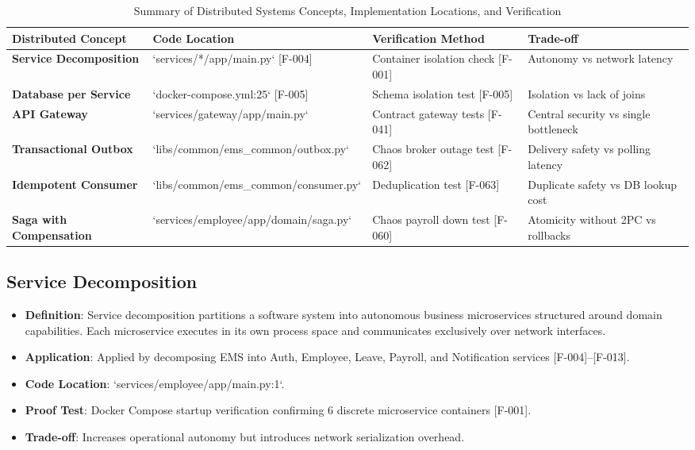 \documentclass[11pt,a4paper]{article}
\begin{document}
\begin{table}[htbp]
\caption{Summary of Distributed Systems Concepts, Implementation Locations, and Verification}
\centering
\begin{tabularx}{\linewidth}{l X X X}
\toprule
\textbf{Distributed Concept} & \textbf{Code Location} & \textbf{Verification Method} & \textbf{Trade-off} \\
\midrule
\textbf{Service Decomposition} & `services/*/app/main.py` [F-004] & Container isolation check [F-001] & Autonomy vs network latency \\
\textbf{Database per Service} & `docker-compose.yml:25` [F-005] & Schema isolation test [F-005] & Isolation vs lack of joins \\
\textbf{API Gateway} & `services/gateway/app/main.py` & Contract gateway tests [F-041] & Central security vs single bottleneck \\
\textbf{Transactional Outbox} & `libs/common/ems\_common/outbox.py` & Chaos broker outage test [F-062] & Delivery safety vs polling latency \\
\textbf{Idempotent Consumer} & `libs/common/ems\_common/consumer.py` & Deduplication test [F-063] & Duplicate safety vs DB lookup cost \\
\textbf{Saga with Compensation} & `services/employee/app/domain/saga.py` & Chaos payroll down test [F-060] & Atomicity without 2PC vs rollbacks \\
\bottomrule
\end{tabularx}
\end{table}

\subsection{Service Decomposition}
\begin{itemize}
    \item \textbf{Definition}: Service decomposition partitions a software system into autonomous business microservices structured around domain capabilities. Each microservice executes in its own process space and communicates exclusively over network interfaces.
    \item \textbf{Application}: Applied by decomposing EMS into Auth, Employee, Leave, Payroll, and Notification services [F-004]--[F-013].
    \item \textbf{Code Location}: `services/employee/app/main.py:1`.
    \item \textbf{Proof Test}: Docker Compose startup verification confirming 6 discrete microservice containers [F-001].
    \item \textbf{Trade-off}: Increases operational autonomy but introduces network serialization overhead.
\end{itemize}
\end{document}
